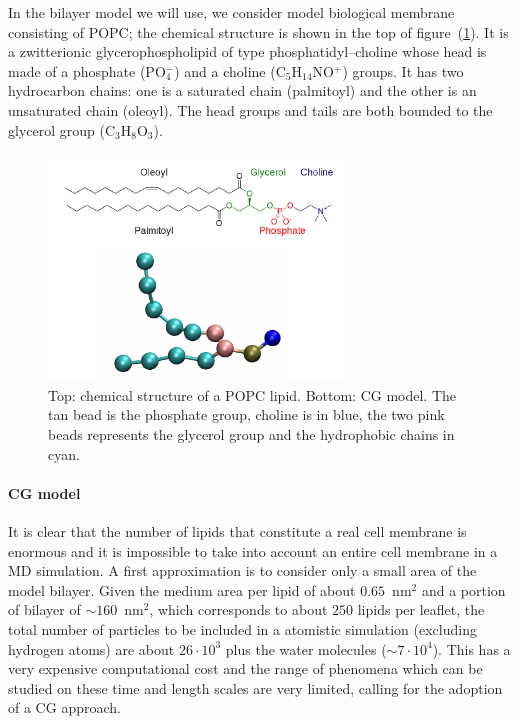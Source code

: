 In the bilayer model we will use, we consider model biological membrane consisting of \ac{POPC}; the chemical structure is shown in the top of figure~(\ref{fig:popc}). It is a zwitterionic glycerophospholipid of type phosphatidyl--choline whose head is made of a phosphate (PO$_4^-$) and a choline (C$_5$H$_{14}$NO$^+$) groups. It has two hydrocarbon chains: one is a saturated chain (palmitoyl) and the other is an unsaturated chain (oleoyl). The head groups and tails are both bounded to the glycerol group (C$_3$H$_8$O$_3$).
\begin{figure}[!ht]
	\centering
	\includegraphics[width=0.7\textwidth]{./img/POPC/popc}
	\caption{Top: chemical structure of a \acs{POPC} lipid. Bottom: \martini \acs{CG} model. The tan bead is the phosphate group, choline is in blue, the two pink beads represents the glycerol group and the hydrophobic chains in cyan.}
	\label{fig:popc}
\end{figure}

\paragraph{\textbf{CG model}} It is clear that the number of lipids that constitute a real cell membrane is 
enormous and it is impossible to take into account an entire cell membrane in a \ac{MD} simulation. A first 
approximation is to consider only a small area of the model bilayer. Given the medium area per lipid of about 
$0.65$~nm$^2$ and a portion of bilayer of $\sim 160$~nm$^2$, which corresponds to about $250$ lipids per leaflet, 
the total number of particles to be included in a atomistic simulation (excluding hydrogen atoms) are about 
$26\cdot 10^3$ plus the water molecules ($\sim 7\cdot 10^4$). This has a very expensive computational cost and 
the range of phenomena which can be studied on these time and length scales are very limited, calling for the 
adoption of a \ac{CG} approach.

